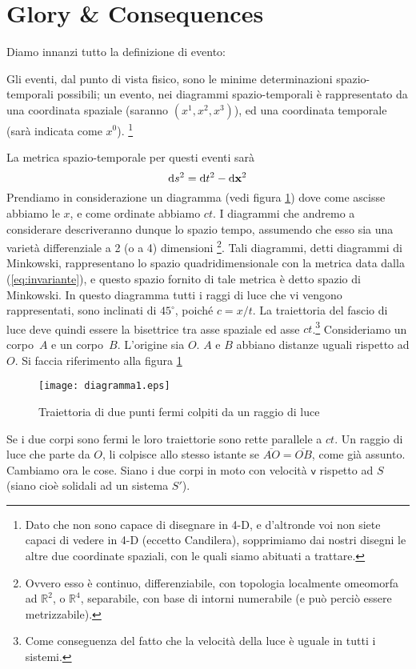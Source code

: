 \section{Glory \& Consequences}
Diamo innanzi tutto la definizione di evento:
\begin{definizione}
  Gli eventi, dal punto di vista fisico, sono le minime determinazioni
  spazio-temporali possibili; un evento, nei diagrammi
  spazio-temporali \`e rappresentato da una coordinata spaziale
  (saranno $(x^1,x^2,x^3)$), ed una coordinata temporale (sar\`a
  indicata come $x^0$).%
  \footnote{Dato che non sono capace di disegnare
    in 4-D, e d'altronde voi non siete capaci di vedere in 4-D
    (eccetto Candilera), sopprimiamo dai nostri disegni le altre due
    coordinate spaziali, con le quali siamo abituati a trattare.}
\end{definizione}
La metrica spazio-temporale per questi eventi sar\`a
\begin{equation}
  \label{eq:invariante}
  \mathrm{d} s^2 = \mathrm{d} t^2 - \mathrm{d} \mathbf{x}^2
\end{equation}
Prendiamo in considerazione un diagramma (vedi figura
\ref{fig:diagramma1}) dove come ascisse abbiamo le $x$, e come
ordinate abbiamo $ct$. I diagrammi che andremo a considerare
descriveranno dunque lo spazio tempo, assumendo che esso sia una
variet\`a differenziale a 2 (o a 4) dimensioni \footnote{Ovvero esso
  \`e continuo, differenziabile, con topologia localmente omeomorfa ad
  $\mathbb{R}^2$, o $\mathbb{R}^4$, separabile, con base di intorni
  numerabile (e pu\`o perci\`o essere metrizzabile).}. Tali diagrammi,
detti diagrammi di Minkowski,
rappresentano lo spazio quadridimensionale con la metrica data dalla
(\ref{eq:invariante}), e questo spazio fornito di tale metrica \`e
detto spazio di Minkowski. In questo
diagramma tutti i raggi di luce che vi vengono rappresentati, sono
inclinati di $45^{\circ}$, poich\'e $c = x / t$. La traiettoria del
fascio di luce deve quindi essere la bisettrice tra asse spaziale ed
asse $ct$.\footnote{Come conseguenza del fatto che la velocit\`a della
  luce \`e uguale in tutti i sistemi.} Consideriamo un corpo~$A$ e un
corpo~$B$. L'origine sia $O$. $A$ e $B$ abbiano distanze uguali
rispetto ad $O$. Si faccia riferimento alla figura
\ref{fig:diagramma1}

\begin{figure}[htbp]
  \begin{center}
       
    \texttt{[image: diagramma1.eps]}
    \caption{Traiettoria di due punti fermi colpiti da un raggio di
      luce} \label{fig:diagramma1}
  \end{center}
\end{figure}
Se i due corpi sono fermi le loro traiettorie sono rette parallele a
$ct$. Un raggio di luce che parte da $O$, li colpisce allo stesso
istante se $\overline{AO}=\overline{OB}$, come gi\`a assunto. Cambiamo
ora le cose. Siano i due corpi in moto con velocit\`a
$\mathbf{\mathsf{v}}$ rispetto ad $S$ (siano cio\`e solidali ad un
sistema $S'$). %

